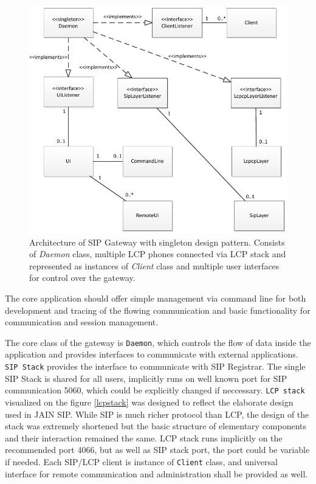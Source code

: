 \begin{figure}[H]
\centering
\includegraphics[width=14cm]{fig/sipgw.pdf}
\caption{Architecture of SIP Gateway with singleton design pattern. Consists
of \textit{Daemon} class, multiple LCP phones connected via LCP stack and 
represented as instances of \textit{Client} class and multiple user interfaces
for control over the gateway.}
\label{gw}
\end{figure}

The core application should offer simple management via command line for 
both development and tracing of the flowing communication and basic functionality
for communication and session management. 

The core class of the gateway is \texttt{Daemon}, which controls the flow of data inside 
the application and provides interfaces to communicate with external 
applications.
\texttt{SIP Stack} provides the interface to communicate with SIP Registrar. 
The single SIP Stack is shared for all users, implicitly runs on well known port
for SIP communication 5060, which could be explicitly changed if neccessary.
\texttt{LCP stack} visualized on the figure \ref{lcpstack} was designed to reflect
the elaborate design used in JAIN SIP\cite{jainsip}. While SIP is much richer 
protocol than LCP, the design of the stack was extremely shortened but the basic
structure of elementary components and their interaction remained the same. LCP 
stack runs implicitly on the recommended port 4066, but as well as SIP stack 
port, the port could be variable if needed.
Each SIP/LCP client is instance of \texttt{Client} class, and universal interface for 
remote communication and administration shall be provided as well.


